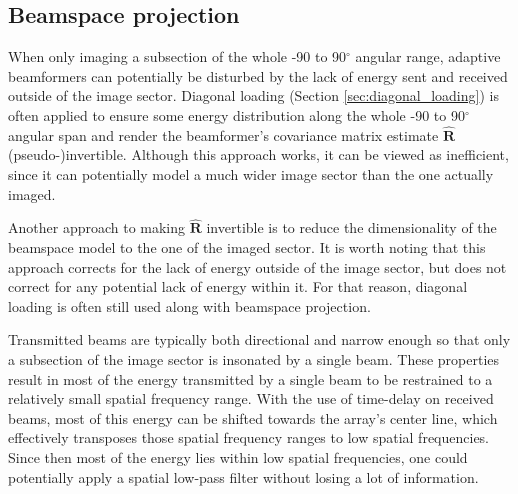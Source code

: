 \subsection{Beamspace projection}
\label{sec:beamspace_projection}
When only imaging a subsection of the whole -90 to 90$^\circ$ angular range, adaptive beamformers can potentially be disturbed by the lack of energy sent and received outside of the image sector.
Diagonal loading (Section \ref{sec:diagonal_loading}) is often applied to ensure some energy distribution along the whole -90 to 90$^\circ$ angular span and render the beamformer's covariance matrix estimate $\boldsymbol{\hat{R}}$ (pseudo-)invertible. Although this approach works, it can be viewed as inefficient, since it can potentially model a much wider image sector than the one actually imaged.

Another approach to making $\boldsymbol{\hat{R}}$ invertible is to reduce the dimensionality of the beamspace model to the one of the imaged sector.
It is worth noting that this approach corrects for the lack of energy outside of the image sector, but does not correct for any potential lack of energy within it. For that reason, diagonal loading is often still used along with beamspace projection.

Transmitted beams are typically both directional and narrow enough so that only a subsection of the image sector is insonated by a single beam. These properties result in most of the energy transmitted by a single beam to be restrained to a relatively small spatial frequency range. With the use of time-delay on received beams, most of this energy can be shifted towards the array's center line, which effectively transposes those spatial frequency ranges to low spatial frequencies. Since then most of the energy lies within low spatial frequencies, one could potentially apply a spatial low-pass filter without losing a lot of information.

